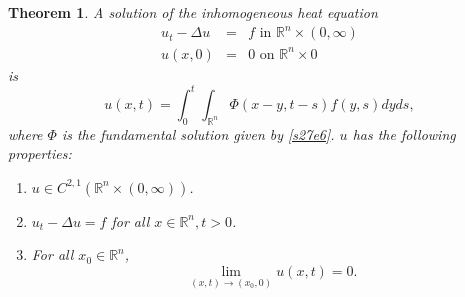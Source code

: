 \documentclass{article}
\theoremstyle{plain}
\newtheorem{thm}{Theorem}
\numberwithin{thm}{section}
\theoremstyle{plain}
\numberwithin{prop}{section}
\theoremstyle{definition}
\numberwithin{defn}{section}
\theoremstyle{remark}
\numberwithin{equation}{section}
\begin{document}
\begin{thm}\label{s27t2}
A solution of the inhomogeneous heat equation
\begin{eqnarray*}
u_t - \Delta u &=& f \text{ in } \mathbb{R}^n \times (0, \infty) \\
u(x, 0) &=& 0 \text{ on } \mathbb{R}^n \times {0} 
\end{eqnarray*}
is 
\begin{equation}\label{s27e18}
u(x, t) = \int_0^t\int_{\mathbb{R}^n}\Phi(x - y,t - s)f(y, s)dyds,
\end{equation}
where $\Phi$ is the fundamental solution given by \eqref{s27e6}. $u$ has the following properties:
\begin{enumerate}
\item $u \in C^{2, 1}(\mathbb{R}^n \times (0, \infty))$.
\item $u_t - \Delta u = f$ for all $x \in \mathbb{R}^n, t > 0$.
\item For all $x_0 \in \mathbb{R}^n$,
\[
\lim_{(x,t)\rightarrow(x_0,0)}u(x, t) = 0.
\]
\end{enumerate}
\end{thm}
\end{document}

